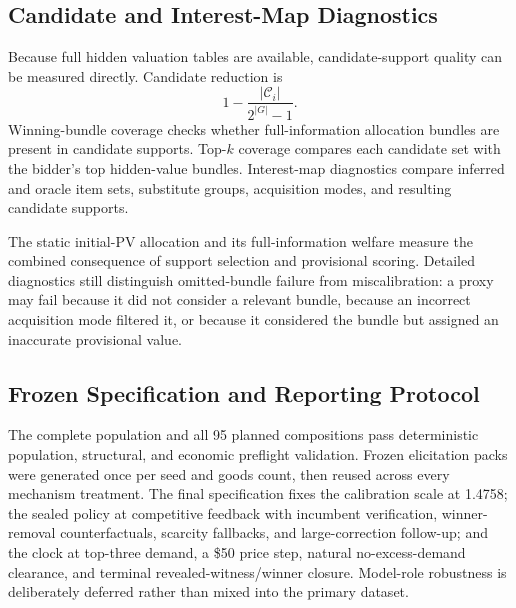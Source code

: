 \subsection{Candidate and Interest-Map Diagnostics}

Because full hidden valuation tables are available, candidate-support quality can be measured directly. Candidate reduction is
\[
1-\frac{|\mathcal{C}_i|}{2^{|G|}-1}.
\]
Winning-bundle coverage checks whether full-information allocation bundles
are present in candidate supports. Top-\(k\) coverage compares each candidate
set with the bidder's top hidden-value bundles. Interest-map diagnostics
compare inferred and oracle item sets, substitute groups, acquisition modes,
and resulting candidate supports.

The static initial-PV allocation and its full-information welfare measure the
combined consequence of support selection and provisional scoring. Detailed
diagnostics still distinguish omitted-bundle failure from miscalibration: a
proxy may fail because it did not consider a relevant bundle, because an
incorrect acquisition mode filtered it, or because it considered the bundle
but assigned an inaccurate provisional value.

\subsection{Frozen Specification and Reporting Protocol}

The complete population and all 95 planned compositions pass deterministic
population, structural, and economic preflight validation. Frozen
elicitation packs were generated once per seed and goods count, then reused
across every mechanism treatment. The final specification fixes the
calibration scale at 1.4758; the sealed policy at competitive feedback with
incumbent verification, winner-removal counterfactuals, scarcity fallbacks,
and large-correction follow-up; and the clock at top-three demand, a \$50
price step, natural no-excess-demand clearance, and terminal
revealed-witness/winner closure. Model-role robustness is deliberately
deferred rather than mixed into the primary dataset.

